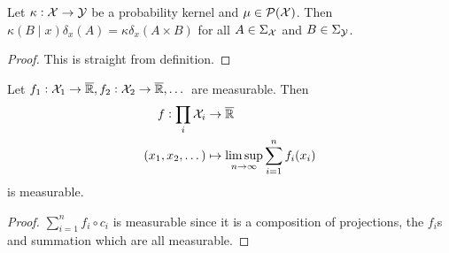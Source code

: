 \documentclass{article}
\begin{document}
\begin{prop}
  Let $\kappa : \mathcal{X} \to \mathcal{Y}$ be a probability kernel
  and $\mu \in \mathcal{P}(\mathcal{X})$.
  Then $\kappa(B \mid x)\delta_x(A) = \kappa \delta_x(A \times B)$
  for all $A \in \Sigma_{\mathcal{X}}$ and $B \in \Sigma_\mathcal{Y}$.
\end{prop}
\begin{proof}
  This is straight from definition.
\end{proof}





\begin{prop}
  Let $f_1 : \mathcal{X}_1 \to \overline{\mathbb{R}}, f_2 : \mathcal{X}_2 \to \overline{\mathbb{R}}, \dots$
  are measurable. Then
  \begin{align*}
    f: \prod_i \mathcal{X}_i &\to \overline{\mathbb{R}}
    \\ (x_1, x_2, \dots) &\mapsto \limsup_{n \to \infty}
    \sum_{i=1}^n f_i(x_i)
  \end{align*}
  is measurable.
  \label{prop:limsupSumMeas}
\end{prop}
\begin{proof}
  $\sum_{i=1}^n f_i \circ c_i$ is measurable since it is a composition of
  projections, the $f_i$s and summation which are all measurable.
\end{proof}
\end{document}
